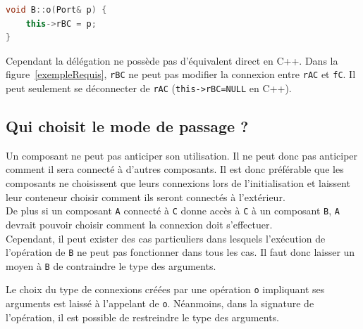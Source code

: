 \documentclass[11pt,a4paper,openany,oneside]{book}
\begin{document}
\newpage

\begin{lstlisting}[language=C++, caption=Equivalent en C++ d'un passage de port requis en paramètre de o]
void B::o(Port& p) {
    this->rBC = p;  
}
\end{lstlisting}
Cependant la délégation ne possède pas d'équivalent direct en C++. Dans la figure~\ref{exempleRequis}, \texttt{rBC} ne peut pas modifier la connexion entre \texttt{rAC} et \texttt{fC}. Il peut seulement se déconnecter de \texttt{rAC} (\texttt{this->rBC=NULL} en C++).

\subsection{Qui choisit le mode de passage ?}

Un composant ne peut pas anticiper son utilisation. Il ne peut donc pas anticiper comment il sera connecté à d'autres composants. Il est donc préférable que les composants ne choisissent que leurs connexions lors de l'initialisation et laissent leur conteneur choisir comment ils seront connectés à l'extérieur.\\
De plus si un composant \texttt{A} connecté à \texttt{C} donne accès à \texttt{C} à un composant \texttt{B}, \texttt{A} devrait pouvoir choisir comment la connexion doit s'effectuer.\\
Cependant, il peut exister des cas particuliers dans lesquels l'exécution de l'opération de \texttt{B} ne peut pas fonctionner dans tous les cas. Il faut donc laisser un moyen à \texttt{B} de contraindre le type des arguments.

Le choix du type de connexions créées par une opération \texttt{o} impliquant ses arguments est laissé à l'appelant de \texttt{o}. Néanmoins, dans la signature de l'opération, il est possible de restreindre le type des arguments.
\end{document}
